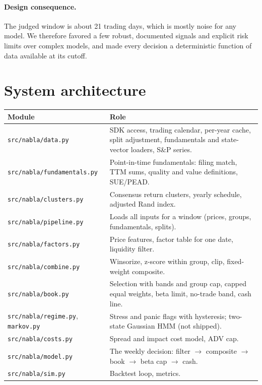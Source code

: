 \documentclass[11pt]{article}
\newcommand{\code}[1]{\texttt{#1}}
\begin{document}
\paragraph{Design consequence.} The judged window is about 21 trading days, which is mostly noise for any model. We
therefore favored a few robust, documented signals and explicit risk limits over complex models, and made every
decision a deterministic function of data available at its cutoff.

\section{System architecture}

\begin{table}[H]\centering\small
\begin{tabularx}{\textwidth}{lL}
\toprule
Module & Role \\
\midrule
\code{src/nabla/data.py} & SDK access, trading calendar, per-year cache, split adjustment, fundamentals and state-vector loaders, S\&P series. \\
\code{src/nabla/fundamentals.py} & Point-in-time fundamentals: filing match, TTM sums, quality and value definitions, SUE/PEAD. \\
\code{src/nabla/clusters.py} & Consensus return clusters, yearly schedule, adjusted Rand index. \\
\code{src/nabla/pipeline.py} & Loads all inputs for a window (prices, groups, fundamentals, splits). \\
\code{src/nabla/factors.py} & Price features, factor table for one date, liquidity filter. \\
\code{src/nabla/combine.py} & Winsorize, z-score within group, clip, fixed-weight composite. \\
\code{src/nabla/book.py} & Selection with bands and group cap, capped equal weights, beta limit, no-trade band, cash line. \\
\code{src/nabla/regime.py}, \code{markov.py} & Stress and panic flags with hysteresis; two-state Gaussian HMM (not shipped). \\
\code{src/nabla/costs.py} & Spread and impact cost model, ADV cap. \\
\code{src/nabla/model.py} & The weekly decision: filter $\to$ composite $\to$ book $\to$ beta cap $\to$ cash. \\
\code{src/nabla/sim.py} & Backtest loop, metrics. \\

\end{tabularx}
\end{table}
\end{document}
